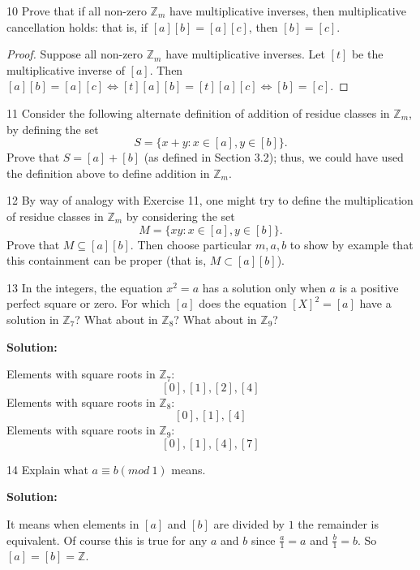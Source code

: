 \begin{problem}{10}
    Prove that if all non-zero $\mathbb{Z}_m$ have multiplicative inverses,
    then multiplicative cancellation holds: that is, if $[a][b] = [a][c]$, 
    then $[b] = [c]$.
\end{problem}
\solved

\begin{proof}
    Suppose all non-zero $\mathbb{Z}_m$ have multiplicative inverses.
    Let $[t]$ be the multiplicative inverse of $[a]$.
    Then $[a][b] = [a][c] \iff [t][a][b] = [t][a][c] \iff [b] = [c]$.
\end{proof}

\begin{problem}{11}
    Consider the following alternate definition of addition of residue classes in
    $\mathbb{Z}_m$, by defining the set
    \[S = \{x + y : x \in [a], y \in [b]\}.\]
    Prove that $S = [a] + [b]$ (as defined in Section 3.2); thus, we could have used the
    definition above to define addition in $\mathbb{Z}_m$.
\end{problem}
\unsolved

\begin{problem}{12}
    By way of analogy with Exercise 11, one might try to define the multiplication of
    residue classes in $\mathbb{Z}_m$ by considering the set
    \[M = \{xy : x \in [a], y \in [b]\}.\]
    Prove that $M \subseteq [a][b]$. Then choose particular $m, a, b$ to show by example
    that this containment can be proper (that is, $M \subset [a][b]$).
\end{problem}
\unsolved

\begin{problem}{13}
    In the integers, the equation $x^2 = a$ has a solution only when $a$
    is a positive perfect square or zero. For which $[a]$ does the equation 
    $[X]^2 = [a]$ have a solution in $\mathbb{Z}_7$?
    What about in $\mathbb{Z}_8$?
    What about in $\mathbb{Z}_9$?
\end{problem}
\solved

\textbf{Solution:}

Elements with square roots in $\mathbb{Z}_7$: 
\[[0], [1], [2], [4]\]
Elements with square roots in $\mathbb{Z}_8$: 
\[[0], [1], [4]\]
Elements with square roots in $\mathbb{Z}_9$: 
\[[0], [1], [4], [7]\]

\begin{problem}{14}
    Explain what $a \equiv b (mod\ 1)$ means.
\end{problem}
\solved

\textbf{Solution:}

It means when elements in $[a]$ and $[b]$ are divided by $1$ the remainder is equivalent.
Of course this is true for any $a$ and $b$ since $\frac{a}{1} = a$ and $\frac{b}{1} = b$.
So $[a] = [b] = \mathbb{Z}$.
